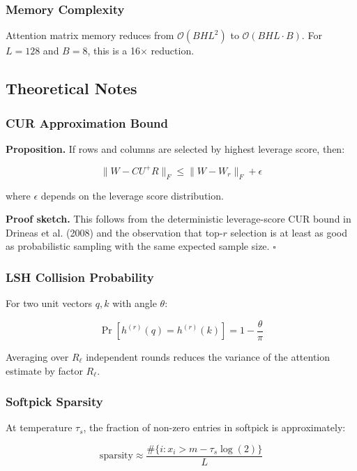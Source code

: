 \subsubsection{Memory Complexity}

Attention matrix memory reduces from $\mathcal{O}(B H L^2)$ to 
$\mathcal{O}(B H L \cdot B)$. For $L = 128$ and $B = 8$, this is a 16$\times$ reduction.

\subsection{Theoretical Notes}

\subsubsection{CUR Approximation Bound}

\textbf{Proposition.} If rows and columns are selected by highest leverage score, then:

\[
\|W - C U^+ R\|_F \leq \|W - W_r\|_F + \epsilon
\tag{4.27}
\]

where $\epsilon$ depends on the leverage score distribution.

\textbf{Proof sketch.} This follows from the deterministic leverage-score CUR bound 
in Drineas et al. (2008) and the observation that top-$r$ selection is at least 
as good as probabilistic sampling with the same expected sample size. $\square$

\subsubsection{LSH Collision Probability}

For two unit vectors $q, k$ with angle $\theta$:

\[
\Pr[h^{(r)}(q) = h^{(r)}(k)] = 1 - \frac{\theta}{\pi}
\tag{4.28}
\]

Averaging over $R_\ell$ independent rounds reduces the variance of the 
attention estimate by factor $R_\ell$.

\subsubsection{Softpick Sparsity}

At temperature $\tau_s$, the fraction of non-zero entries in softpick is 
approximately:

\[
\text{sparsity} \approx \frac{\#\{i : x_i > m - \tau_s \log(2)\}}{L}
\tag{4.29}
\]

